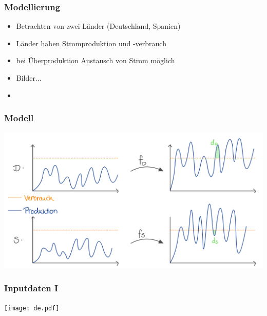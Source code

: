 \documentclass[aspectratio=169,t]{beamer}
\begin{document}
	
	\begin{frame}
		\frametitle{Modellierung}
		\vspace*{2mm}
		\begin{minipage}{1\linewidth}
			
				\begin{itemize}
					
					\item Betrachten von zwei Länder (Deutschland, Spanien)
					
					\item Länder haben Stromproduktion und -verbrauch
					
					\item bei Überproduktion Austausch von Strom möglich 
					
					\item Bilder...
					
					
					\item
				\end{itemize}
							
		
		\end{minipage}	
		
	\end{frame}


	\begin{frame}
		\frametitle{Modell}
		\vspace{-2mm}
		
		
		\begin{minipage}{.9\linewidth}
			\centering
			\includegraphics[width=.9\linewidth]{IMG_320.jpg}
			
		\end{minipage}
		
	\end{frame}

	\begin{frame}
		\frametitle{Inputdaten I}
		\vspace{-2mm}
		\texttt{[image: de.pdf]}
		
	\end{frame}
\end{document}
